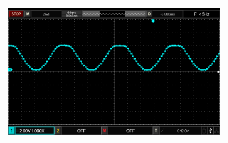 \begin{figure}[H]
      \centering
      \includegraphics[width=0.5\textwidth]{images/125HZ}
\end{figure}